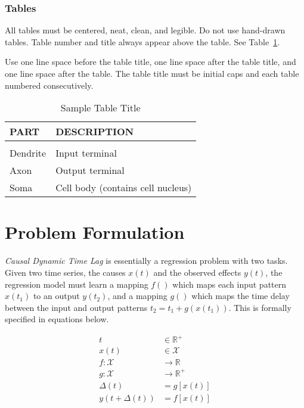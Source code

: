 \documentclass[twoside]{article}
\begin{document}
\subsubsection{Tables}

All tables must be centered, neat, clean, and legible. Do not use hand-drawn tables.
Table number and title always appear above the table.
See Table~\ref{sample-table}.

Use one line space before the table title, one line space after the table title,
and one line space after the table. The table title must be
initial caps and each table numbered consecutively.

\begin{table}[h]
\caption{Sample Table Title} \label{sample-table}
\begin{center}
\begin{tabular}{ll}
\textbf{PART}  &\textbf{DESCRIPTION} \\
\hline \\
Dendrite         &Input terminal \\
Axon             &Output terminal \\
Soma             &Cell body (contains cell nucleus) \\
\end{tabular}
\end{center}
\end{table}

\section{Problem Formulation}

\emph{Causal Dynamic Time Lag} is essentially a regression problem with two tasks. Given two time series, 
the causes $x(t)$ and the observed effects $y(t)$, the regression model must learn a mapping $f()$ which
maps each input pattern $x(t_1)$ to an output $y(t_2)$, and a mapping $g()$ which maps the time delay between
the input and output patterns $t_2 = t_1 + g(x(t_1))$. This is formally specified in equations below.

\begin{align}
t & \in \mathbb{R}^{+}\\
x(t) & \in \mathcal{X} \\
f: \mathcal{X} & \rightarrow \mathbb{R}\\
g: \mathcal{X} & \rightarrow \mathbb{R}^{+}\\
\Delta(t) & = g[x(t)] \\
y(t + \Delta(t)) & = f[x(t)]
\end{align}
\end{document}

